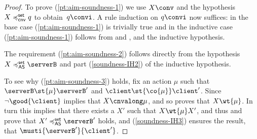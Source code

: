 \begin{proof}
  To prove (\ref{pt:aim-soundness-1}) we use $X \conv$ and the hypothesis
  $X \mathrel{\preccurlyeq^{\mathsf{set}}_{\mathsf{cnv}}} q$ to obtain~$q \convi$. A rule induction on $q
  \convi$ now suffices: in the base case (\ref{pt:aim-soundness-1}) is
  trivially true and in the inductive case (\ref{pt:aim-soundness-1}) follows from
   and
  ,
  and the inductive hypothesis.

  The requirement (\ref{pt:aim-soundness-2}) follows directly from
  the hypothesis $X \asleqset \serverB$ and
  part (\ref{soundness-IH2}) of the inductive hypothesis.


  To see why (\ref{pt:aim-soundness-3}) holds, fix an action $\mu$ such that $\serverB \st{\mu} \serverB'$
  and $\client \st{\co{\mu}} \client'$.
  Since $\lnot \good{ \client }$  implies that $ X \cnvalong \mu $,
  and so  proves that $X \wt{ \mu }$.
  In turn this implies that there exists a $X'$ such that $X \wt{\mu} X'$, and thus
   and
  prove that $X' \asleqset \serverB'$ holds, and
  (\ref{soundness-IH3}) ensures the result, \ie that $\musti{\serverB'}{\client'}$.
\end{proof}

